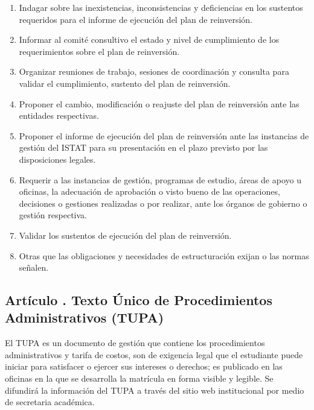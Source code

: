 \begin{enumerate}
\item Indagar sobre las inexistencias, inconsistencias y deficiencias en los sustentos requeridos para el informe de ejecución del plan de reinversión. 
\item Informar al comité consultivo el estado y nivel de cumplimiento de los requerimientos sobre el plan de reinversión. 
\item Organizar reuniones de trabajo, sesiones de coordinación y consulta para validar el cumplimiento, sustento del plan de reinversión. 
\item Proponer el cambio, modificación o reajuste del plan de reinversión ante las entidades respectivas. 
\item Proponer el informe de ejecución del plan de reinversión ante las instancias de gestión del ISTAT para su presentación en el plazo previsto por las disposiciones legales. 
\item Requerir a las instancias de gestión, programas de estudio, áreas de apoyo u oficinas, la adecuación de aprobación o visto bueno de las operaciones, decisiones o gestiones realizadas o por realizar, ante los órganos de gobierno o gestión respectiva. 
\item Validar los sustentos de ejecución del plan de reinversión. 
\item Otras que las obligaciones y necesidades de estructuración exijan o las normas señalen.   
\end{enumerate}
\subsection{Artículo . Texto Único de Procedimientos Administrativos (TUPA)}
\addtocounter{ns}{1}
El TUPA es un documento de gestión que contiene los procedimientos administrativos y tarifa de costos, son de exigencia legal que el estudiante puede iniciar para satisfacer o ejercer sus intereses o derechos; es publicado en las oficinas en la que se desarrolla la matrícula en forma visible y legible. Se difundirá la información del TUPA a través del sitio web institucional por medio de secretaria académica.






